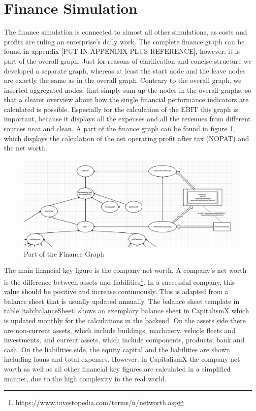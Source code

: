 \section{Finance Simulation}
\label{sec:finance_simulation}

The finance simulation is connected to almost all other simulations, as costs and profits are ruling an enterprise's daily work. The complete finance graph can be found in appendix [PUT IN APPENDIX PLUS REFERENCE], however, it is part of the overall graph. Just for reasons of clarification and concise structure we developed a separate graph, whereas at least the start node and the leave nodes are exactly the same as in the overall graph. Contrary to the overall graph, we inserted aggregated nodes, that simply sum up the nodes in the overall graphs, so that a clearer overview about how the single financial performance indicators are calculated is possible. Especially for the calculation of the EBIT this graph is important, because it displays all the expenses and all the revenues from different sources neat and clean. A part of the finance graph can be found in figure \ref{fig:financeGraphPart}, which displays the calculation of the net operating profit after tax (NOPAT) and the net worth.

\begin{figure} [!htbp]
    \centering
    \includegraphics [width=\textwidth] {images/financeGraphPart2.png}
    \caption{Part of the Finance Graph}
    \label{fig:financeGraphPart}
\end{figure}

The main financial key figure is the company net worth. A company's net worth is the difference between assets and liabilities\footnote{https://www.investopedia.com/terms/n/networth.asp}. In a successful company, this value should be positive and increase continuously. This is adapted from a balance sheet that is usually updated annually. The balance sheet template in table \ref{tab:balanceSheet} shows an exemplary balance sheet in CapitalismX which is updated monthly for the calculations in the backend. On the assets side there are non-current assets, which include buildings, machinery, vehicle fleets and investments, and current assets, which include components, products, bank and cash. On the liabilities side, the equity capital and the liabilities are shown including loans and total expenses. However, in CapitalismX the company net worth as well as all other financial key figures are calculated in a simplified manner, due to the high complexity in the real world.

